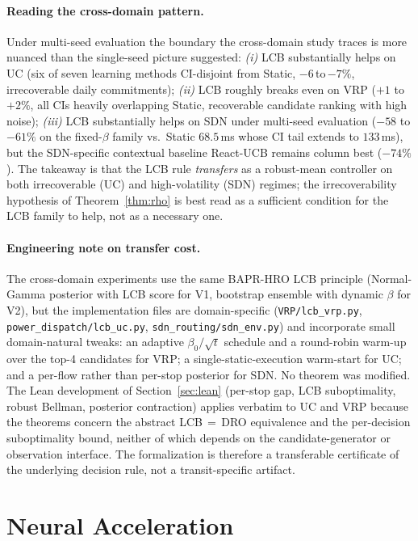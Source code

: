 \documentclass[opre,dblanonrev]{informs4}
\begin{document}
\begin{APPENDICES}
\paragraph{Reading the cross-domain pattern.}
Under multi-seed evaluation the boundary the cross-domain study
traces is more nuanced than the single-seed picture suggested:
\emph{(i)} LCB substantially helps on UC (six of seven learning
methods CI-disjoint from Static, $-6$\,to\,$-7\%$, irrecoverable
daily commitments); \emph{(ii)} LCB roughly breaks even on VRP
($+1$ to $+2\%$, all CIs heavily overlapping Static, recoverable
candidate ranking with high noise); \emph{(iii)} LCB substantially
helps on SDN under multi-seed evaluation ($-58$ to $-61\%$ on the
fixed-$\beta$ family vs.\ Static $68.5$\,ms whose CI tail extends
to $133$\,ms), but the SDN-specific contextual baseline React-UCB
remains column best ($-74\%$). The takeaway is that the LCB rule
\emph{transfers} as a robust-mean controller on both irrecoverable
(UC) and high-volatility (SDN) regimes; the irrecoverability
hypothesis of Theorem~\ref{thm:rho} is best read as a sufficient
condition for the LCB family to help, not as a necessary one.

\paragraph{Engineering note on transfer cost.}
The cross-domain experiments use the same BAPR-HRO LCB principle
(Normal-Gamma posterior with LCB score for V1, bootstrap ensemble
with dynamic $\beta$ for V2), but the implementation files are
domain-specific (\texttt{VRP/lcb\_vrp.py},
\texttt{power\_dispatch/lcb\_uc.py},
\texttt{sdn\_routing/sdn\_env.py}) and incorporate small
domain-natural tweaks: an adaptive $\beta_0/\sqrt{t}$ schedule and a
round-robin warm-up over the top-4 candidates for VRP; a
single-static-execution warm-start for UC; and a per-flow rather
than per-stop posterior for SDN. No theorem was modified. The Lean
development of Section~\ref{sec:lean} (per-stop gap, LCB
suboptimality, robust Bellman, posterior contraction) applies
verbatim to UC and VRP because the theorems concern the abstract
LCB$\,=\,$DRO equivalence and the per-decision suboptimality bound,
neither of which depends on the candidate-generator or observation
interface. The formalization is therefore a transferable certificate
of the underlying decision rule, not a transit-specific artifact.

\section{Neural Acceleration}
\label{ec:neural}


\end{APPENDICES}
\end{document}
